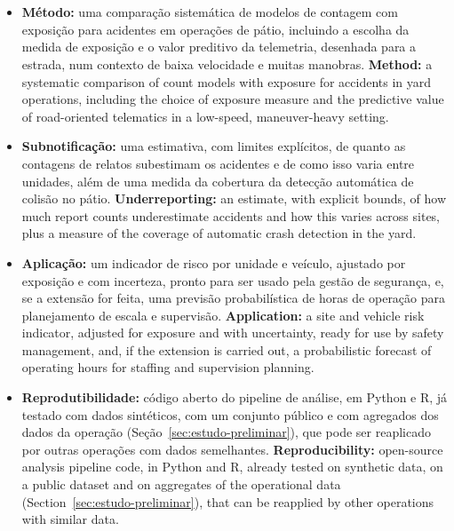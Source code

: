 \section{}
\label{sec:resultados}

\begin{itemize}
  \item \tr%
    {\textbf{Método:} uma comparação sistemática de modelos de contagem com exposição para acidentes em operações de pátio, incluindo a escolha da medida de exposição e o valor preditivo da telemetria, desenhada para a estrada, num contexto de baixa velocidade e muitas manobras.}%
    {\textbf{Method:} a systematic comparison of count models with exposure for accidents in yard operations, including the choice of exposure measure and the predictive value of road-oriented telematics in a low-speed, maneuver-heavy setting.}
  \item \tr%
    {\textbf{Subnotificação:} uma estimativa, com limites explícitos, de quanto as contagens de relatos subestimam os acidentes e de como isso varia entre unidades, além de uma medida da cobertura da detecção automática de colisão no pátio.}%
    {\textbf{Underreporting:} an estimate, with explicit bounds, of how much report counts underestimate accidents and how this varies across sites, plus a measure of the coverage of automatic crash detection in the yard.}
  \item \tr%
    {\textbf{Aplicação:} um indicador de risco por unidade e veículo, ajustado por exposição e com incerteza, pronto para ser usado pela gestão de segurança, e, se a extensão for feita, uma previsão probabilística de horas de operação para planejamento de escala e supervisão.}%
    {\textbf{Application:} a site and vehicle risk indicator, adjusted for exposure and with uncertainty, ready for use by safety management, and, if the extension is carried out, a probabilistic forecast of operating hours for staffing and supervision planning.}
  \item \tr%
    {\textbf{Reprodutibilidade:} código aberto do pipeline de análise, em Python e R, já testado com dados sintéticos, com um conjunto público e com agregados dos dados da operação (Seção~\ref{sec:estudo-preliminar}), que pode ser reaplicado por outras operações com dados semelhantes.}%
    {\textbf{Reproducibility:} open-source analysis pipeline code, in Python and R, already tested on synthetic data, on a public dataset and on aggregates of the operational data (Section~\ref{sec:estudo-preliminar}), that can be reapplied by other operations with similar data.}
\end{itemize}

